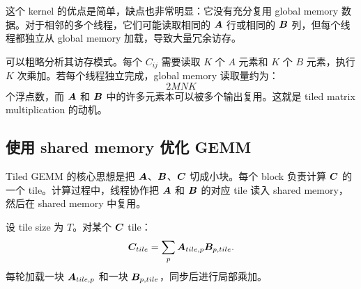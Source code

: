 这个 kernel 的优点是简单，缺点也非常明显：它没有充分复用 global memory 数据。对于相邻的多个线程，它们可能读取相同的 $\bm{A}$ 行或相同的 $\bm{B}$ 列，但每个线程都独立从 global memory 加载，导致大量冗余访存。

可以粗略分析其访存模式。每个 $C_{ij}$ 需要读取 $K$ 个 $A$ 元素和 $K$ 个 $B$ 元素，执行 $K$ 次乘加。若每个线程独立完成，global memory 读取量约为：
\[
  2MNK
\]
个浮点数，而 $\bm{A}$ 和 $\bm{B}$ 中的许多元素本可以被多个输出复用。这就是 tiled matrix multiplication 的动机。

\subsection{使用 shared memory 优化 GEMM}
\label{subsec:shared-memory-gemm}

Tiled GEMM 的核心思想是把 $\bm{A}$、$\bm{B}$、$\bm{C}$ 切成小块。每个 block 负责计算 $\bm{C}$ 的一个 tile。计算过程中，线程协作把 $\bm{A}$ 和 $\bm{B}$ 的对应 tile 读入 shared memory，然后在 shared memory 中复用。

设 tile size 为 $T$。对某个 $\bm{C}$ tile：
\[
  \bm{C}_{tile}
  =
  \sum_{p}
  \bm{A}_{tile,p}
  \bm{B}_{p,tile}.
\]
每轮加载一块 $\bm{A}_{tile,p}$ 和一块 $\bm{B}_{p,tile}$，同步后进行局部乘加。

